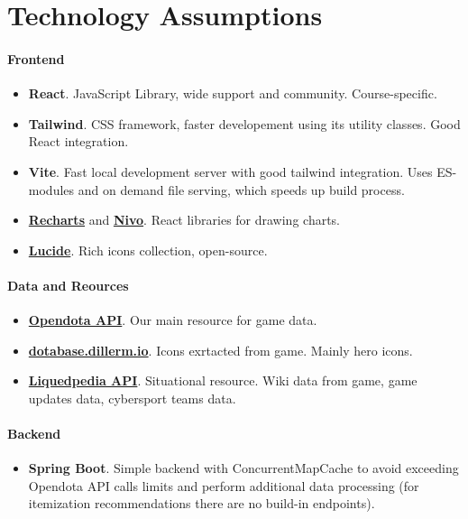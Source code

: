 \section{Technology Assumptions}

 \paragraph{Frontend}
\begin{itemize}

    \item \textbf{React}. JavaScript Library, wide support and community. Course-specific.
    \item \textbf{Tailwind}. CSS framework, faster developement using its utility classes. Good React integration.
    \item \textbf{Vite}. Fast local development server with good tailwind integration.
    Uses ES-modules and on demand file serving, which speeds up build process.

    \item \textbf{\href{https://recharts.org}{Recharts}} and \textbf{\href{https://nivo.rocks/}{Nivo}}. React libraries for drawing charts.
    \item \textbf{\href{https://lucide.dev/}{Lucide}}. Rich icons collection, open-source.

\end{itemize}

\paragraph{Data and Reources}

\begin{itemize}

    \item \textbf{\href{https://docs.opendota.com/}{Opendota API}}. Our main resource for game data.
    \item \textbf{\href{https://dotabase.dillerm.io/}{dotabase.dillerm.io}}. Icons exrtacted from game. Mainly hero icons.
    \item \textbf{\href{https://liquipedia.net/dota2/Main_Page}{Liquedpedia API}}. Situational resource. Wiki data from game, game updates data, cybersport teams data.

\end{itemize}

\paragraph{Backend}

\begin{itemize}

    \item \textbf{Spring Boot}. Simple backend with ConcurrentMapCache to avoid exceeding Opendota API calls limits and
    perform additional data processing (for itemization recommendations there are no build-in endpoints).

\end{itemize}